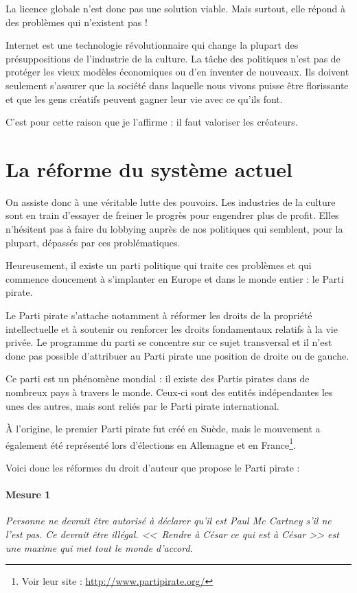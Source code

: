 La licence globale n'est donc pas une solution viable.
Mais surtout, elle répond à des problèmes qui n'existent pas !

Internet est une technologie révolutionnaire qui change la plupart des présuppositions de l'industrie de la culture.
La tâche des politiques n'est pas de protéger les vieux modèles économiques ou d'en inventer de nouveaux.
Ils doivent seulement s'assurer que la société dans laquelle nous vivons puisse être florissante et que les gens créatifs peuvent gagner leur vie avec ce qu'ils font.

C'est pour cette raison que je l'affirme : il faut valoriser les créateurs.

\section{La réforme du système actuel}

On assiste donc à une véritable lutte des pouvoirs.
Les industries de la culture sont en train d'essayer de freiner le progrès pour engendrer plus de profit.
Elles n'hésitent pas à faire du lobbying auprès de nos politiques qui semblent, pour la plupart, dépassés par ces problématiques.

Heureusement, il existe un parti politique qui traite ces problèmes et qui commence doucement à s'implanter en Europe et dans le monde entier : le Parti pirate.

Le Parti pirate s'attache notamment à réformer les droits de la propriété intellectuelle et à soutenir ou renforcer les droits fondamentaux relatifs à la vie privée.
Le programme du parti se concentre sur ce sujet transversal et il n'est donc pas possible d'attribuer au Parti pirate une position de droite ou de gauche.

Ce parti est un phénomène mondial : il existe des Partis pirates dans de nombreux pays à travers le monde.
Ceux-ci sont des entités indépendantes les unes des autres, mais sont reliés par le Parti pirate international.

À l'origine, le premier Parti pirate fut créé en Suède, mais le mouvement a également été représenté lors d'élections en Allemagne et en France\footnote{Voir leur site : \url{http://www.partipirate.org/}}.

Voici donc les réformes du droit d'auteur que propose le Parti pirate :

\paragraph{Mesure 1}
\textit{Personne ne devrait être autorisé à déclarer qu'il est Paul Mc Cartney s'il ne l'est pas.
Ce devrait être illégal.
<<~Rendre à César ce qui est à César >> est une maxime qui met tout le monde d'accord.}

